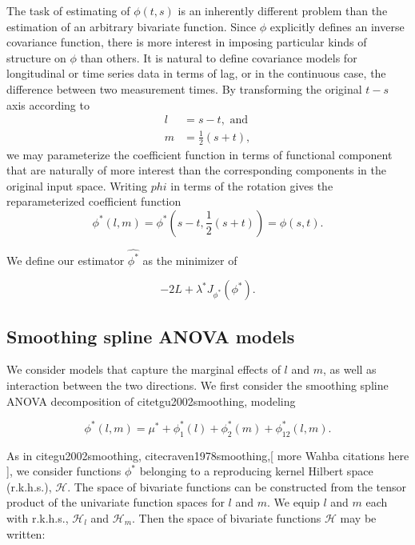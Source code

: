 \documentclass[12pt]{article}
\theoremstyle{definition}
\begin{document}
The task of estimating of $\phi\left(t,s\right)$ is an inherently different problem than the estimation of an arbitrary bivariate function. Since $\phi$ explicitly defines an inverse covariance function, there is more interest in imposing particular kinds of structure on $\phi$ than others. It is natural to define covariance models for longitudinal or time series data in terms of lag, or in the continuous case, the difference between two measurement times. By transforming the original $t-s$ axis according to  
\begin{align*}
l &= s-t, \mbox{ and} \\
m &= \frac{1}{2}\left(s+t\right),
\end{align*}
\noindent
we may parameterize the coefficient function in terms of functional component that are naturally of more interest than the corresponding components in the original input space. Writing $phi$ in terms of the rotation gives the reparameterized coefficient function 
\begin{equation}
\phi^*\left(l,m\right) = \phi^*\left(s-t, \frac{1}{2}\left(s+t\right)\right) = \phi\left(s,t\right).
\end{equation}

We define our estimator $\hat{\phi^*}$ as the minimizer of

\begin{equation} 
-2 L + \lambda^* J_{\phi^*}\left(\phi^*\right) \label{eq:phi-star-objective-fnc}.
\end{equation}

\subsection{Smoothing spline ANOVA models}

We consider models that capture the marginal effects of $l$ and $m$, as well as interaction between the two directions. We first consider the smoothing spline ANOVA decomposition of citet{gu2002smoothing},  modeling 

\begin{equation}
\phi^*\left(l,m\right) = \mu^* + \phi_1^*\left(l\right) + \phi_2^*\left(m\right) + \phi_{12}^*\left(l,m\right).   \label{eq:ANOVA}
\end{equation}
\noindent 

As in cite{gu2002smoothing}, cite{craven1978smoothing},[ more Wahba citations here ], we consider functions $\phi^*$ belonging to a reproducing kernel Hilbert space (r.k.h.s.), $\mathcal{H}$. The space of bivariate functions can be constructed from the tensor product of the univariate function spaces for $l$ and $m$. We equip $l$ and $m$ each with r.k.h.s., $\mathcal{H}_l$ and $\mathcal{H}_m$. Then the space of bivariate functions $\mathcal{H}$ may be written:
\end{document}
